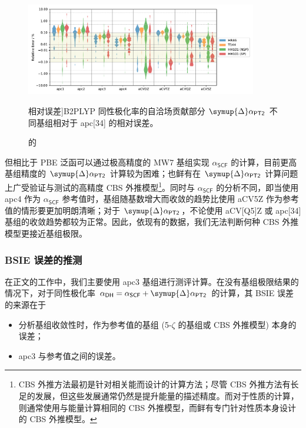 \begin{figure}[!ht]
    \centering
    \includegraphics[width=0.9\textwidth]{assets/converg-b2p-pt2-apc4.pdf}
    \caption[B2PLYP $\symup{\Delta} \alpha_\textsf{PT2}$ 不同基组相对于 apc[34] 的相对误差]{B2PLYP 同性极化率的自洽场贡献部分 $\symup{\Delta} \alpha_\textsf{PT2}$ 不同基组相对于 apc[34] 的相对误差。}
    \label{fig.6.converg-b2p-pt2-apc4}
\end{figure}

但相比于 PBE 泛函可以通过极高精度的 MW7 基组实现 $\alpha_\textsf{SCF}$ 的计算，目前更高基组精度的 $\symup{\Delta} \alpha_\textsf{PT2}$ 计算较为困难；也鲜有在 $\symup{\Delta} \alpha_\textsf{PT2}$ 计算问题上广受验证与测试的高精度 CBS 外推模型\footnote{CBS 外推方法最初是针对相关能而设计的计算方法\cite{Nyden-Petersson.JCP.1981}；尽管 CBS 外推方法有长足的发展\cite{Peterson-Dunning.JCP.1994, Nyden-Petersson.JCP.1981, Petersson-Mantzaris.JCP.1988, Jensen-Jensen.TCA.2005, Karton-Martin.TCA.2006, Klopper-Kutzelnigg.JMST.1986, Kutzelnigg-Morgan.JCP.1992, Martin-Martin.CPL.1996, Helgaker-Noga.JCP.1997, Halkier-Wilson.CPL.1998, Halkier-Olsen.CPL.1999}，但这些发展通常仍然是提升能量的描述精度。而对于性质的计算，则通常使用与能量计算相同的 CBS 外推模型\cite{Monten-Deleuze.MP.2011, Huzak-Deleuze.JCP.2013, Hait-Head-Gordon.JCTC.2018, Hait-Head-Gordon.PCCP.2018}，而鲜有专门针对性质本身设计的 CBS 外推模型。}。同时与 $\alpha_\textsf{SCF}$ 的分析不同，即当使用 apc4 作为 $\alpha_\textsf{SCF}$ 参考值时，基组随基数增大而收敛的趋势比使用 aCV5Z 作为参考值的情形要更加明朗清晰；对于 $\symup{\Delta} \alpha_\textsf{PT2}$，不论使用 aCV[Q5]Z 或 apc[34] 基组的收敛趋势都较为正常。因此，依现有的数据，我们无法判断何种 CBS 外推模型更接近基组极限。

\subsubsection{BSIE 误差的推测}

在正文的工作中，我们主要使用 apc3 基组进行测评计算。在没有基组极限结果的情况下，对于同性极化率 $\alpha_\textsf{DH} = \alpha_\textsf{SCF} + \symup{\Delta} \alpha_\textsf{PT2}$ 的计算，其 BSIE 误差的来源在于
\begin{itemize}[nosep]
    \item 分析基组收敛性时，作为参考值的基组 (5-$\zeta$ 的基组或 CBS 外推模型) 本身的误差；
    \item apc3 与参考值之间的误差。
\end{itemize}


